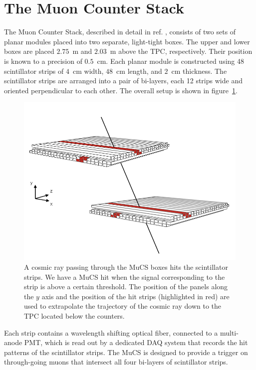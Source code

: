 \documentclass[a4paper,11pt]{article}
\begin{document}
\section{The Muon Counter Stack}\label{sec:proc}
The Muon Counter Stack, described in detail in ref. \cite{mucs}, consists of two sets of planar modules placed into two separate, light-tight boxes. The upper and lower boxes are placed $2.75$~m and $2.03$~m above the TPC, respectively. Their position is known to a precision of $0.5$~cm. Each planar module is constructed using 48 scintillator strips of $4$~cm width, $48$~cm length, and $2$~cm thickness. The scintillator strips are arranged into a pair of bi-layers, each 12 strips wide and oriented perpendicular to each other. The overall setup is shown in figure~\ref{fig:boxes}.

\begin{figure}[htbp]
  \begin{center}
    \includegraphics[width=0.7\linewidth]{figures/boxes.png}
    \caption{A cosmic ray passing through the MuCS boxes hits the scintillator strips. We have a MuCS hit when the signal corresponding to the strip is above a certain threshold. The position of the panels along the $y$ axis and the position of the hit strips (highlighted in red) are used to extrapolate the trajectory of the cosmic ray down to the TPC located below the counters.} \label{fig:boxes}
  \end{center}
\end{figure}

Each strip contains a wavelength shifting optical fiber, connected to a multi-anode PMT, which is read out by a dedicated DAQ system that records the hit patterns of the scintillator strips.
The MuCS is designed to provide a trigger on through-going muons that intersect all four bi-layers of scintillator strips.
\end{document}
